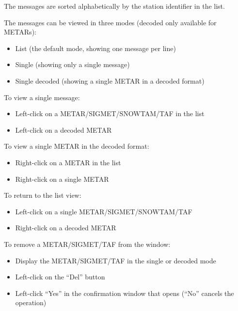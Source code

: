 \documentclass[a4paper,oneside,11pt]{memoir}
\begin{document}
\bigskip

The messages are sorted alphabetically by the station identifier in the list.

\bigskip

The messages can be viewed in three modes (decoded only available for METARs):

\begin{itemize}
    \item List (the default mode, showing one message per line)
    \item Single (showing only a single message)
    \item Single decoded (showing a single METAR in a decoded format)
\end{itemize}

\bigskip

To view a single message:

\begin{itemize}
    \item Left-click on a METAR/SIGMET/SNOWTAM/TAF in the list
    \item Left-click on a decoded METAR
\end{itemize}

\bigskip

To view a single METAR in the decoded format:

\begin{itemize}
    \item Right-click on a METAR in the list
    \item Right-click on a single METAR
\end{itemize}

\bigskip

To return to the list view:

\begin{itemize}
    \item Left-click on a single METAR/SIGMET/SNOWTAM/TAF
    \item Right-click on a decoded METAR
\end{itemize}

\bigskip

To remove a METAR/SIGMET/TAF from the window:

\begin{itemize}
    \item Display the METAR/SIGMET/TAF in the single or decoded mode
    \item Left-click on the “Del” button
    \item Left-click “Yes” in the confirmation window that opens (“No” cancels the operation)
\end{itemize}
\end{document}
